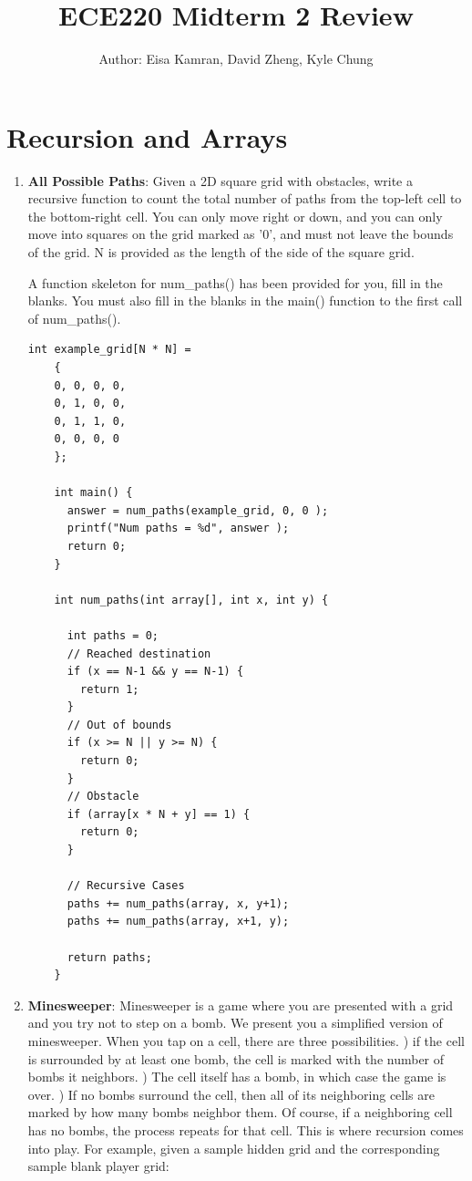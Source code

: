 \documentclass{article}
\title{ECE220 Midterm 2 Review}
\author{Author: Eisa Kamran, David Zheng, Kyle Chung}
\begin{document}
\maketitle

\section{
    Recursion and Arrays
}

\begin{enumerate}[label=(\alph*)]
    \item \textbf{All Possible Paths}: Given a 2D square grid with obstacles, write a recursive function to count the total number of paths from the top-left cell to the bottom-right cell. You can only move right or down, and you can only move into squares on the grid marked as '0', and must not leave the bounds of the grid. N is provided as the length of the side of the square grid.
    
    A function skeleton for num\_paths() has been provided for you, fill in the blanks. You must also fill in the blanks in the main() function to the first call of num\_paths().

    \begin{lstlisting}[style=CStyle]
    int example_grid[N * N] = 
    {
    0, 0, 0, 0,
    0, 1, 0, 0,
    0, 1, 1, 0,
    0, 0, 0, 0 
    };
    
    int main() {
      answer = num_paths(example_grid, 0, 0 );
      printf("Num paths = %d", answer );
      return 0;
    }
    
    int num_paths(int array[], int x, int y) {
      
      int paths = 0;
      // Reached destination
      if (x == N-1 && y == N-1) {
        return 1;
      }
      // Out of bounds
      if (x >= N || y >= N) {
        return 0;
      }
      // Obstacle
      if (array[x * N + y] == 1) {
        return 0;
      }
      
      // Recursive Cases
      paths += num_paths(array, x, y+1);
      paths += num_paths(array, x+1, y);
    
      return paths;
    } \end{lstlisting}

    \item  \textbf{Minesweeper}: Minesweeper is a game where you are presented with a grid and you try not to step on a bomb. We present you a simplified version of minesweeper. When you tap on a cell, there are three possibilities. \newline {}) if the cell is surrounded by at least one bomb, the cell is marked with the number of bombs it neighbors. ) The cell itself has a bomb, in which case the game is over. ) If no bombs surround the cell, then all of its neighboring cells are marked by how many bombs neighbor them. Of course, if a neighboring cell has no bombs, the process repeats for that cell. This is where recursion comes into play. For example, given a sample hidden grid and the corresponding sample blank player grid: 
    \newline
    

\end{enumerate}
\end{document}
